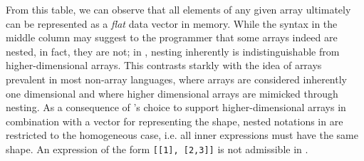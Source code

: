 \begin{table}[ht!]
    \newcommand{\repr}[3]{%
        \begin{tabular}{ll}
            rank:  & #1   \\
            shape: & [#2] \\
            data:  & [#3]
        \end{tabular}\vspace{2pt}\\\hline\noalign{\vskip 2pt}}
    \centering
    \caption{Array representation in \sac{}}
    \label{tab:array}
\end{table}

\noindent
From this table, we can observe that all elements of any given array ultimately can be represented as a \textit{flat} data vector in memory.
While the \sac{} syntax in the middle column may suggest to the programmer that some arrays indeed are nested, in fact, they are not; in \sac{}, nesting inherently is indistinguishable from higher-dimensional arrays.
This contrasts starkly with the idea of arrays prevalent in most non-array languages, where arrays are considered inherently one dimensional and where higher dimensional arrays are mimicked through nesting.
As a consequence of \sac{}'s choice to support higher-dimensional arrays in combination with a vector for representing the shape, nested notations in \sac{} are restricted to the homogeneous case, i.e. all inner expressions must have the same shape.
An expression of the form \texttt{[[1],\,[2,3]]} is not admissible in \sac{}.

